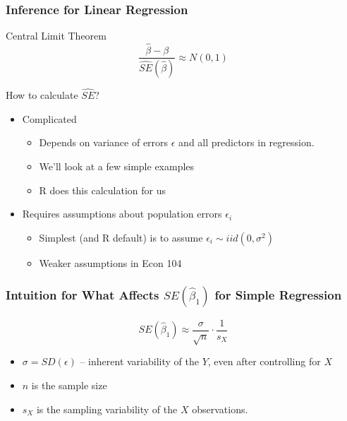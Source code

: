 \documentclass{beamer}
\begin{document}
\begin{frame}
\frametitle{Inference for Linear Regression}
	\begin{block}{Central Limit Theorem}
		$$\frac{\widehat{\beta} - \beta}{\widehat{SE}(\widehat{\beta})} \approx N(0,1)$$ 
\end{block}

\begin{block}{How to calculate $\widehat{SE}$?}
	\begin{itemize}
\item Complicated 
	\begin{itemize}
\item Depends on variance of errors $\epsilon$ and all predictors in regression. 
\item We'll look at a few simple examples 
\item R does this calculation for us 
\end{itemize}
\item Requires assumptions about population errors $\epsilon_i$ 
	\begin{itemize}
\item Simplest (and R default) is to assume $\epsilon_i \sim iid (0,\sigma^2)$ 
\item Weaker assumptions in Econ 104 
\end{itemize}

\end{itemize}
\end{block}

\end{frame}
\begin{frame}
\frametitle{Intuition for What Affects $SE(\widehat{\beta}_1)$ for Simple Regression}

	$$SE(\widehat{\beta}_1) \approx \frac{\sigma}{\sqrt{n}} \cdot \frac{1}{s_X}$$
	\begin{itemize}
	\item $\sigma = SD(\epsilon)$ -- inherent variability of the $Y$, even after controlling for $X$
	\item $n$ is the sample size
	\item $s_X$ is the sampling variability of the $X$ observations.
	\end{itemize}
\end{frame}
\end{document}
